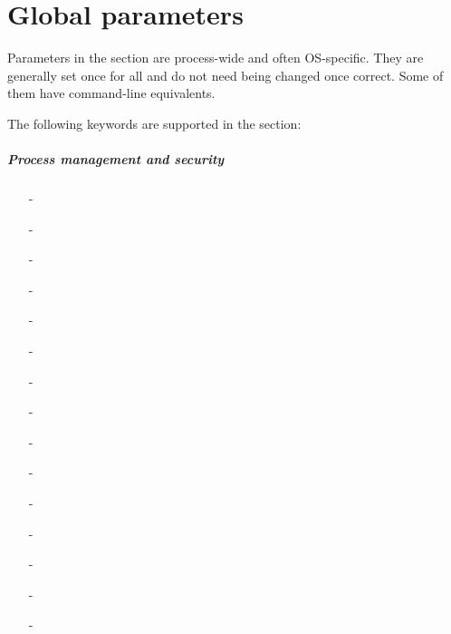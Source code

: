 \chapter{Global parameters}
\label{chap:global_parameters}

Parameters in the  section are process-wide and often OS-specific. They
are generally set once for all and do not need being changed once correct. Some
of them have command-line equivalents.

The following keywords are supported in the  section:

\begin{multicols}{2}
\paragraph*{Process management and security}
  \begin{itemize}
    \item[-] 
    \item[-] 
    \item[-] 
    \item[-] 
    \item[-] 
    \item[-] 
    \item[-] 
    \item[-] 
    \item[-] 
    \item[-] 
    \item[-] 
    \item[-] 
    \item[-] 
    \item[-] 
    \item[-] 
  \end{itemize}

\end{multicols}
